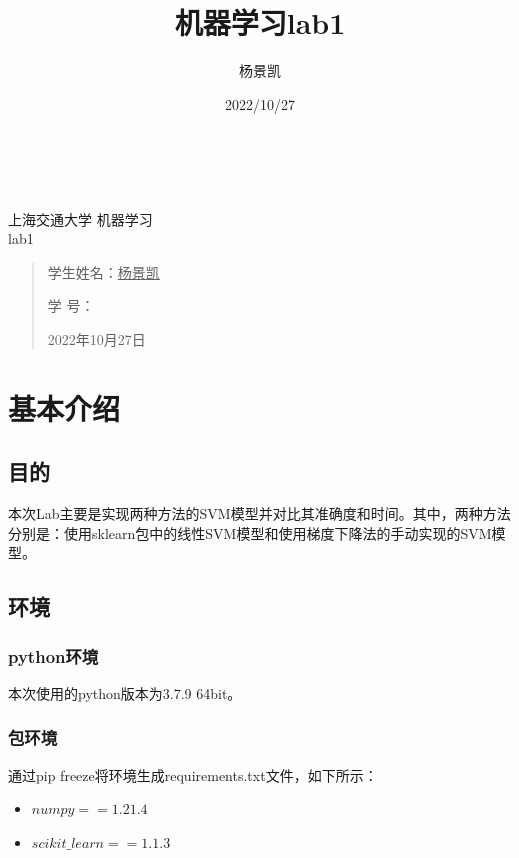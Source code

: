 \documentclass[UTF8]{ctexart}
\date{}
\title{机器学习lab1}
\author{杨景凯}
\date{2022/10/27}
\begin{document}
 
\begin{center}
    \quad \\
    \quad \\
    \kaishu \fontsize{45}{17} 上\quad 海\quad 交\quad 通\quad 大\quad 学
    \vskip 3.5cm
    \heiti {} 机器学习\\
    lab1
\end{center}
\vskip 3.5cm
\begin{quotation}
    \songti \fontsize{30}{30}
    \doublespacing
    \par\setlength\parindent{12em}
    \quad 
\begin{center}

    学生姓名：\underline{\qquad    \quad \quad 杨景凯    \quad  \quad\qquad }

    学\hspace{0.61cm} 号：\underline{\quad \quad{}\quad\quad}

\end{center}
    
    \centering
    2022年10月27日
\end{quotation}
\clearpage
\tableofcontents
\clearpage
\section{基本介绍}
\subsection{目的}
本次Lab主要是实现两种方法的SVM模型并对比其准确度和时间。其中，两种方法分别是：使用sklearn包中的线性SVM模型和使用梯度下降法的手动实现的SVM模型。
\subsection{环境}
\subsubsection{python环境}
本次使用的python版本为3.7.9 64bit。
\subsubsection{包环境}
通过pip freeze将环境生成requirements.txt文件，如下所示：
\begin{itemize}
    \item $numpy==1.21.4$
    \item $scikit\_learn==1.1.3$
\end{itemize}
\end{document}
